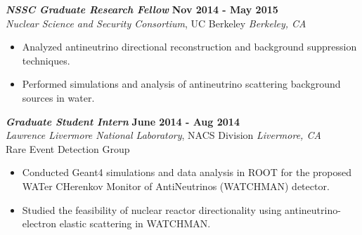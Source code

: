 {\sl\bf NSSC Graduate Research Fellow} \hfill {\bf Nov 2014 - May 2015} \\
{\sl Nuclear Science and Security Consortium}, UC Berkeley \hfill {\sl Berkeley, CA} %
\vspace{2pt}
\begin{itemize}[leftmargin=4ex] \itemsep -2pt
\item Analyzed antineutrino directional reconstruction and background suppression techniques.
\item Performed simulations and analysis of antineutrino scattering background sources in water.
\end{itemize} 
 
{\sl\bf Graduate Student Intern} \hfill {\bf June 2014 - Aug 2014} \\
{\sl Lawrence Livermore National Laboratory}, NACS Division \hfill {\sl Livermore, CA} \\
Rare Event Detection Group
\vspace{2pt}
\begin{itemize}[leftmargin=4ex] \itemsep -2pt
\item Conducted Geant4 simulations and data analysis in ROOT for the proposed WATer CHerenkov Monitor of AntiNeutrinos (WATCHMAN) detector.
\item Studied the feasibility of nuclear reactor directionality using antineutrino-electron elastic scattering in WATCHMAN.
\end{itemize}

